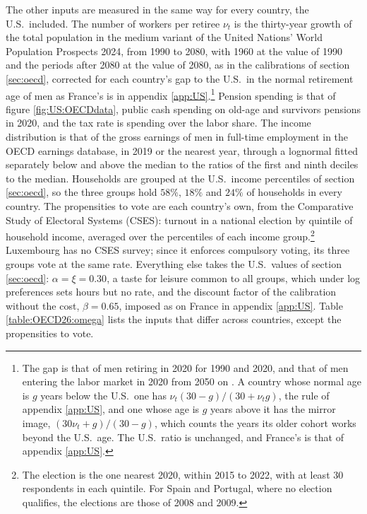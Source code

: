 The other inputs are measured in the same way for every country, the U.S.\ included. The number of workers per retiree $\nu_t$ is the thirty-year growth of the total population in the medium variant of the United Nations' World Population Prospects 2024, from 1990 to 2080, with 1960 at the value of 1990 and the periods after 2080 at the value of 2080, as in the calibrations of section \ref{sec:oecd}, corrected for each country's gap to the U.S.\ in the normal retirement age of men as France's is in appendix \ref{app:US}.\footnote{The gap is that of men retiring in 2020 for 1990 and 2020, and that of men entering the labor market in 2020 from 2050 on \parencite[figure 3.7]{OECDpen}. A country whose normal age is $g$ years below the U.S.\ one has $\nu_t(30-g)/(30+\nu_t g)$, the rule of appendix \ref{app:US}, and one whose age is $g$ years above it has the mirror image, $(30\nu_t+g)/(30-g)$, which counts the years its older cohort works beyond the U.S.\ age. The U.S.\ ratio is unchanged, and France's is that of appendix \ref{app:US}.} Pension spending is that of figure \ref{fig:US:OECDdata}, public cash spending on old-age and survivors pensions in 2020, and the tax rate is spending over the labor share. The income distribution is that of the gross earnings of men in full-time employment in the OECD earnings database, in 2019 or the nearest year, through a lognormal fitted separately below and above the median to the ratios of the first and ninth deciles to the median. Households are grouped at the U.S.\ income percentiles of section \ref{sec:oecd}, so the three groups hold $58\%$, $18\%$ and $24\%$ of households in every country. The propensities to vote are each country's own, from the Comparative Study of Electoral Systems (CSES): turnout in a national election by quintile of household income, averaged over the percentiles of each income group.\footnote{The election is the one nearest 2020, within 2015 to 2022, with at least 30 respondents in each quintile. For Spain and Portugal, where no election qualifies, the elections are those of 2008 and 2009.} Luxembourg has no CSES survey; since it enforces compulsory voting, its three groups vote at the same rate. Everything else takes the U.S.\ values of section \ref{sec:oecd}: $\alpha = \xi = 0.30$, a taste for leisure common to all groups, which under log preferences sets hours but no rate, and the discount factor of the calibration without the cost, $\beta = 0.65$, imposed as on France in appendix \ref{app:US}. Table \ref{table:OECD26:omega} lists the inputs that differ across countries, except the propensities to vote.

